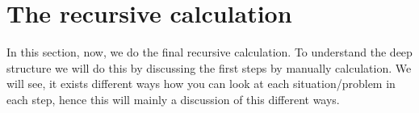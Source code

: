 \chapter{The recursive calculation}
\label{ch:therecursivecalculation}
\minitoc
In this section, now, we do the final recursive calculation. To understand the deep structure we will do this by discussing the first steps by manually calculation. We will see, it exists different ways how you can look at each situation/problem in each step, hence this will mainly a discussion of this different ways.























